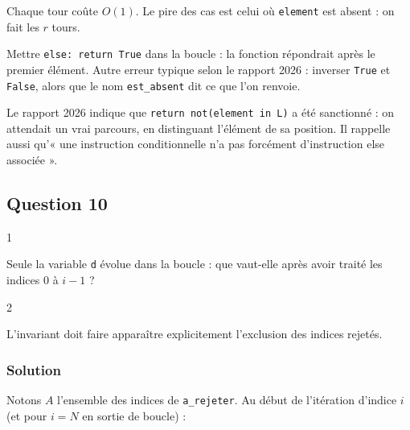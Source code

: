 \documentclass[11pt,a4paper]{article}
\newcommand{\equationajustee}[1]{%
  \sbox{\boiteequation}{$\displaystyle #1$}%
  \ifdim\wd\boiteequation>\linewidth
    \[\resizebox{\linewidth}{!}{\usebox{\boiteequation}}\]%
  \else
    \[#1\]%
  \fi}
\begin{document}
Chaque tour coûte \(O(1)\). Le pire des cas est celui où \texttt{element} est absent : on fait les \(r\) tours.

\equationajustee{\boxed{C_{\text{pire}}(r) = \Theta(r)}}

\begin{piege}

Mettre \texttt{else:\allowbreak{}\ return\ True} dans la boucle : la fonction répondrait après le premier élément. Autre erreur typique selon le rapport 2026 : inverser \texttt{True} et \texttt{False}, alors que le nom \texttt{est\_absent} dit ce que l'on renvoie.

\end{piege}

\begin{jury}

Le rapport 2026 indique que \texttt{return\ not(\allowbreak{}element\ in\ L)\allowbreak{}} a été sanctionné : on attendait un vrai parcours, en distinguant l'élément de sa position. Il rappelle aussi qu'« une instruction conditionnelle n'a pas forcément d'instruction else associée ».

\end{jury}

\hypertarget{question-10}{%
\subsection{Question 10}\label{question-10}}

\begin{indication}{1}

Seule la variable \texttt{d} évolue dans la boucle : que vaut-elle après avoir traité les indices \(0\) à \(i-1\) ?

\end{indication}

\begin{indication}{2}

L'invariant doit faire apparaître explicitement l'exclusion des indices rejetés.

\end{indication}

\hypertarget{solution-9}{%
\subsubsection{Solution}\label{solution-9}}

Notons \(A\) l'ensemble des indices de \texttt{a\_rejeter}. Au début de l'itération d'indice \(i\) (et pour \(i = N\) en sortie de boucle) :
\end{document}
